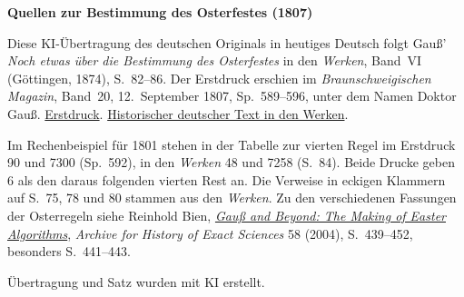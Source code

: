 \clearpage\thispagestyle{empty}
\begin{center}\textbf{Quellen zur Bestimmung des Osterfestes (1807)}\end{center}
\noindent Diese KI-Übertragung des deutschen Originals in heutiges Deutsch folgt Gauß’ \textit{Noch etwas über die Bestimmung des Osterfestes} in den \textit{Werken}, Band~VI (Göttingen, 1874), S.~82--86. Der Erstdruck erschien im \textit{Braunschweigischen Magazin}, Band~20, 12.~September 1807, Sp.~589--596, unter dem Namen Doktor Gauß. \href{https://www.digitale-sammlungen.de/de/view/bsb10531610?page=303}{Erstdruck}. \href{https://gdz.sub.uni-goettingen.de/id/PPN236007467}{Historischer deutscher Text in den Werken}.
\par\smallskip\noindent Im Rechenbeispiel für 1801 stehen in der Tabelle zur vierten Regel im Erstdruck 90 und 7300 (Sp.~592), in den \textit{Werken} 48 und 7258 (S.~84). Beide Drucke geben 6 als den daraus folgenden vierten Rest an. Die Verweise in eckigen Klammern auf S.~75, 78 und 80 stammen aus den \textit{Werken}. Zu den verschiedenen Fassungen der Osterregeln siehe Reinhold Bien, \href{https://doi.org/10.1007/s00407-004-0078-5}{\textit{Gauß and Beyond: The Making of Easter Algorithms}}, \textit{Archive for History of Exact Sciences} 58 (2004), S.~439--452, besonders S.~441--443.
\par\smallskip\noindent Übertragung und Satz wurden mit KI erstellt.
\clearpage
